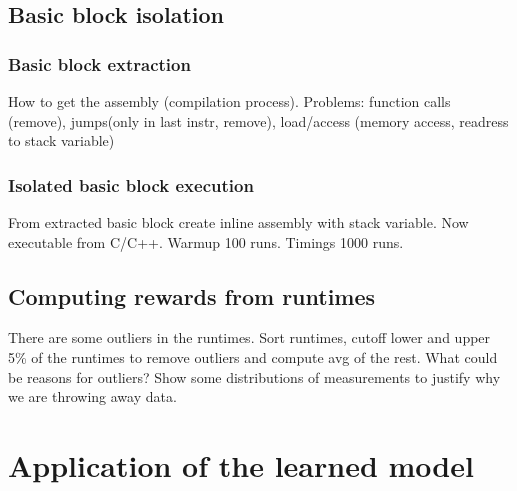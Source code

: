 \subsection{Basic block isolation}
\subsubsection{Basic block extraction}
How to get the assembly (compilation process).
Problems: function calls (remove), jumps(only in last instr, remove), load/access (memory access, readress to stack variable)
\subsubsection{Isolated basic block execution}
From extracted basic block create inline assembly with stack variable. Now executable from C/C++.
Warmup 100 runs. Timings 1000 runs. 
\subsection{Computing rewards from runtimes}
There are some outliers in the runtimes. Sort runtimes, cutoff lower and upper 5\% of the runtimes to remove outliers and compute avg of the rest.
What could be reasons for outliers?
Show some distributions of measurements to justify why we are throwing away data.

\section{Application of the learned model}
\label{sec:approach:ml-scheduler}




